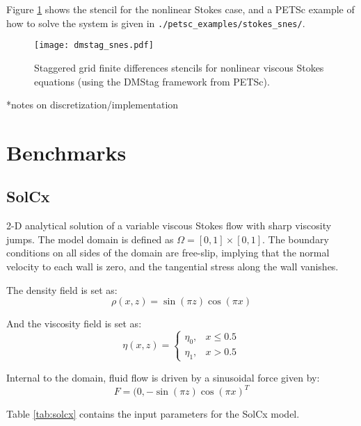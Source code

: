 \documentclass[a4paper,11pt]{article}
\begin{document}
Figure \ref{fig:stokes_snes} shows the stencil for the nonlinear Stokes case, and a PETSc example of how to solve the system is given in \texttt{./petsc\_examples/stokes\_snes/}.

\begin{figure}
\begin{center}
\noindent \texttt{[image: dmstag\_snes.pdf]} 
\caption{Staggered grid finite differences stencils for nonlinear viscous Stokes equations (using the DMStag framework from PETSc).}
\label{fig:stokes_snes}
  \end{center}
\end{figure}

*notes on discretization/implementation

\section{Benchmarks}

\subsection{SolCx \citep{Zhong1996, Moresi1996, Duretz2011}} \label{solcx}
2-D analytical solution of a variable viscous Stokes flow with sharp viscosity jumps. The model domain is defined as $\Omega = [0, 1] \times [0, 1]$. The boundary conditions on all sides of the domain are free-slip, implying that the normal velocity to each wall is zero, and the tangential stress along the wall vanishes. 

The density field is set as:
\begin{equation}
\rho(x,z) = \sin(\pi z) \cos(\pi x)
\end{equation}

And the viscosity field is set as:
\begin{equation}
\eta(x,z) = \left\{\begin{array}{lr}
    \eta_0, &  x \le 0.5\\
    \eta_1, & x > 0.5
  \end{array}\right.
\end{equation}

Internal to the domain, fluid flow is driven by a sinusoidal force given by:
\begin{equation}
F = (0,-\sin(\pi z) \cos(\pi x)^T
\end{equation}

Table \ref{tab:solcx} contains the input parameters for the SolCx model.
\end{document}

